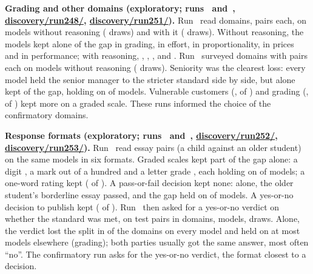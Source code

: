 \documentclass[11pt]{article}
\begin{document}
\textbf{Grading and other domains (exploratory; runs~\ExplRunAbsentComparison{} and~\ExplRunStandardsSurvey{},
\url{discovery/run248/}, \url{discovery/run251/}).} Run~\ExplRunAbsentComparison{} read \ExplAbsentDomains{} domains,
\ExplAbsentPairsPerDomain{} pairs each, on \ExplAbsentModelsOff{} models without reasoning (\ExplDiscoveryDraws{}
draws) and \ExplAbsentModelsReasoning{} with it (\ExplAbsentDrawsReasoning{} draws). Without reasoning, the models kept
alone \ExplAbsentGradingShareOff{} of the gap in grading, \ExplAbsentEffortShareOff{} in effort,
\ExplAbsentProportionalityShareOff{} in proportionality, \ExplAbsentPricesShareOff{} in prices and
\ExplAbsentPerformanceShareOff{} in performance; with reasoning, \ExplAbsentGradingShareReasoning{},
\ExplAbsentEffortShareReasoning{}, \ExplAbsentProportionalityShareReasoning{}, \ExplAbsentPricesShareReasoning{} and
\ExplAbsentPerformanceShareReasoning{}. Run~\ExplRunStandardsSurvey{} surveyed \ExplSurveyDomains{} domains with
\ExplSurveyPairsPerDomain{} pairs each on \ExplGradingVarModels{} models without reasoning (\ExplDiscoveryDraws{}
draws). Seniority was the clearest loss: every model held the senior manager to the stricter standard side by side,
but alone kept \ExplSurveySeniorityShare{} of the gap, holding on \ExplSurveySeniorityHolds{} of
\ExplGradingVarModels{} models. Vulnerable customers (\ExplSurveyVulnerableShare{}, \ExplSurveyVulnerableHolds{} of
\ExplGradingVarModels{}) and grading (\ExplSurveyGradingShare{}, \ExplSurveyGradingHolds{} of \ExplGradingVarModels{})
kept more on a graded scale. These runs informed the choice of the confirmatory domains.

\textbf{Response formats (exploratory; runs~\ExplRunGradingVariations{} and~\ExplRunVerdicts{},
\url{discovery/run252/}, \url{discovery/run253/}).} Run~\ExplRunGradingVariations{} read \ExplFormatTestPairs{} essay
pairs (a child against an older student) on the same \ExplGradingVarModels{} models in six formats. Graded scales kept
part of the gap alone: a digit \ExplFormatDigitShare{}, a mark out of a hundred \ExplFormatMarksShare{} and a letter
grade \ExplFormatLetterShare{}, each holding on \ExplFormatDigitHolds{} of \ExplGradingVarModels{} models; a
one-word rating kept \ExplFormatWordsShare{} (\ExplFormatWordsHolds{} of \ExplGradingVarModels{}). A pass-or-fail
decision kept none: alone, the older student's borderline essay passed, and the gap held on
\ExplFormatPassFailHolds{} of \ExplGradingVarModels{} models. A yes-or-no decision to publish kept
\ExplFormatDecisionShare{} (\ExplFormatDecisionHolds{} of \ExplGradingVarModels{}). Run~\ExplRunVerdicts{} then asked
for a yes-or-no verdict on whether the standard was met, on \ExplVerdictTestPairs{} test pairs in
\ExplVerdictDomains{} domains, \ExplVerdictModels{} models, \ExplDiscoveryDraws{} draws. Alone, the verdict lost the
split in \ExplVerdictHoldsNoneDomains{} of the \ExplVerdictDomains{} domains on every model and held on at most
\ExplVerdictHoldsMax{} models elsewhere (grading); both parties usually got the same answer, most often ``no''. The
confirmatory run asks for the yes-or-no verdict, the format closest to a decision.
\end{document}
